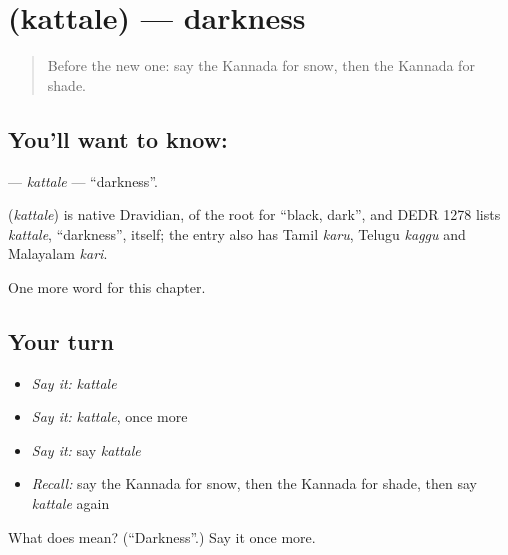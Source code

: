 \section[\texorpdfstring{\kn{ಕತ್ತಲೆ} (kattale)}{ಕತ್ತಲೆ (kattale)}]{ (kattale) — darkness}

\label{lesson:KA-C187-kattale}



\begin{quote}
Before the new one: say the Kannada for snow, then the Kannada for shade.
\end{quote}

\subsection*{You'll want to know: }
\textbf{} — \emph{kattale} — \textquotedblleft{}darkness\textquotedblright{}.

\begin{cousinweb}
\textbf{} (\emph{kattale}) is native Dravidian, of the root for \textquotedblleft{}black, dark\textquotedblright{}, and DEDR 1278 lists \emph{kattale}, \textquotedblleft{}darkness\textquotedblright{}, itself; the entry also has Tamil \emph{karu}, Telugu \emph{kaggu} and Malayalam \emph{kari}.
\end{cousinweb}

\begin{grammarlens}[title={What you've built}]
One more word for this chapter.
\end{grammarlens}

\subsection*{Your turn}
\begin{itemize}
\raggedright
  \item \emph{Say it:} \emph{kattale}
  \item \emph{Say it:} \emph{kattale}, once more
  \item \emph{Say it:} say \emph{kattale}
  \item \emph{Recall:} say the Kannada for snow, then the Kannada for shade, then say \emph{kattale} again
\end{itemize}

\begin{tcolorbox}[breakable,colback=teal!4,colframe=teal!35!black,title={Before you move on}]
What does  mean? (\textquotedblleft{}Darkness\textquotedblright{}.) Say it once more.
\end{tcolorbox}
